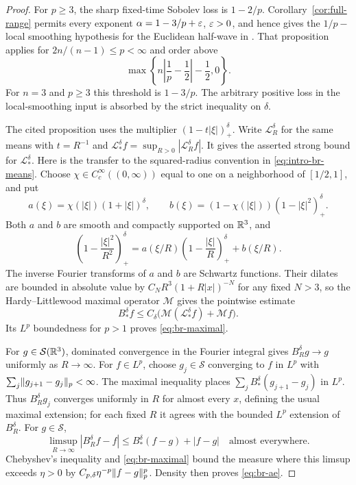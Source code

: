 \begin{proof}
For $p\ge3$, the sharp fixed-time Sobolev loss is $1-2/p$.
Corollary~\ref{cor:full-range} permits every exponent
$\alpha=1-3/p+\varepsilon$, $\varepsilon>0$, and hence gives the $1/p-$ local
smoothing hypothesis for the Euclidean half-wave in
\cite[Proposition~3.3]{BeltranHickmanSogge2019Survey}. That proposition
applies for $2n/(n-1)\le p<\infty$ and order above
\[
 \max\left\{n\left|\frac1p-\frac12\right|-\frac12,0\right\}.
\]
For $n=3$ and $p\ge3$ this threshold is $1-3/p$. The arbitrary
positive loss in the local-smoothing input is absorbed by the strict
inequality on $\delta$.

The cited proposition uses the multiplier $(1-t|\xi|)_+^\delta$.
Write $\mathcal L_R^\delta$ for the same means with $t=R^{-1}$ and
$\mathcal L_*^\delta f=\sup_{R>0}|\mathcal L_R^\delta f|$.
It gives the asserted strong bound for $\mathcal L_*^\delta$.
Here is the transfer to the squared-radius convention in
\eqref{eq:intro-br-means}. Choose $\chi\in C_c^\infty((0,\infty))$
equal to one on a neighborhood of $[1/2,1]$, and put
\[
 a(\xi)=\chi(|\xi|)(1+|\xi|)^\delta,\qquad
 b(\xi)=(1-\chi(|\xi|))(1-|\xi|^2)_+^\delta.
\]
Both $a$ and $b$ are smooth and compactly supported on $\mathbb R^3$, and
\[
 \left(1-\frac{|\xi|^2}{R^2}\right)_+^\delta
 =a(\xi/R)\left(1-\frac{|\xi|}{R}\right)_+^\delta+b(\xi/R).
\]
The inverse Fourier transforms of $a$ and $b$ are Schwartz functions.
Their dilates are bounded in absolute value by
$C_N R^3(1+R|x|)^{-N}$ for any fixed $N>3$, so the
Hardy--Littlewood maximal operator $\mathcal M$ gives the
pointwise estimate
\[
 B_*^\delta f
 \le C_\delta\bigl(\mathcal M(\mathcal L_*^\delta f)+\mathcal Mf\bigr).
\]
Its $L^p$ boundedness for $p>1$ proves \eqref{eq:br-maximal}.

For $g\in\mathcal S(\mathbb R^3)$, dominated convergence in the Fourier
integral gives $B_R^\delta g\to g$ uniformly as $R\to\infty$.
For $f\in L^p$, choose $g_j\in\mathcal S$ converging to $f$ in $L^p$
with $\sum_j\lVert g_{j+1}-g_j\rVert_p<\infty$. The maximal inequality
places $\sum_j B_*^\delta(g_{j+1}-g_j)$ in $L^p$. Thus
$B_R^\delta g_j$ converges uniformly in $R$ for almost every $x$,
defining the usual maximal extension; for each fixed $R$ it agrees
with the bounded $L^p$ extension of $B_R^\delta$. For $g\in\mathcal S$,
\[
 \limsup_{R\to\infty}|B_R^\delta f-f|
 \le B_*^\delta(f-g)+|f-g|
 \quad\text{almost everywhere}.
\]
Chebyshev's inequality and \eqref{eq:br-maximal} bound the measure
where this limsup exceeds $\eta>0$ by
$C_{p,\delta}\eta^{-p}\lVert f-g\rVert_p^p$. Density then proves
\eqref{eq:br-ae}.
\end{proof}


